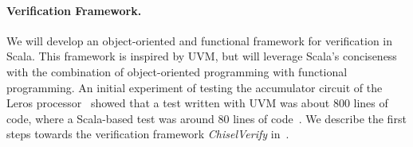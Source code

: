 \documentclass[fleqn,12pt]{article}
\begin{document}

%


\paragraph{Verification Framework.}

We will develop an object-oriented and functional framework for verification in Scala.
This framework is inspired by UVM, but will leverage Scala's conciseness with the
combination of object-oriented programming with functional programming.
An initial experiment of testing the accumulator circuit of the Leros processor~\cite{leros:arcs2019}
showed that a test written with UVM was about 800 lines of code, where a Scala-based
test was around 80 lines of code~\cite{verify:chisel:2020}.
We describe the first steps towards the verification framework \emph{ChiselVerify} in~\cite{ChiselVerify:2021}.





\end{document}

